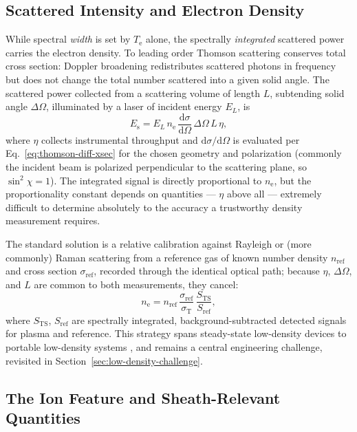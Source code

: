 \subsection{Scattered Intensity and Electron Density}

While spectral \emph{width} is set by $T_{\mathrm{e}}$ alone, the spectrally \emph{integrated} scattered power carries the electron density. To leading order Thomson scattering conserves total cross section: Doppler broadening redistributes scattered photons in frequency but does not change the total number scattered into a given solid angle. The scattered power collected from a scattering volume of length $L$, subtending solid angle $\Delta\Omega$, illuminated by a laser of incident energy $E_{L}$, is
\begin{equation}
E_{\mathrm{s}} = E_{L}\, n_{\mathrm{e}}\, \frac{\mathrm{d}\sigma}{\mathrm{d}\Omega}\,\Delta\Omega\, L\, \eta ,
\label{eq:scattered-energy}
\end{equation}
where $\eta$ collects instrumental throughput and $\mathrm{d}\sigma/\mathrm{d}\Omega$ is evaluated per Eq.~\eqref{eq:thomson-diff-xsec} for the chosen geometry and polarization (commonly the incident beam is polarized perpendicular to the scattering plane, so $\sin^{2}\chi = 1$). The integrated signal is directly proportional to $n_{\mathrm{e}}$, but the proportionality constant depends on quantities — $\eta$ above all — extremely difficult to determine absolutely to the accuracy a trustworthy density measurement requires.

The standard solution is a relative calibration against Rayleigh or (more commonly) Raman scattering from a reference gas of known number density $n_{\mathrm{ref}}$ and cross section $\sigma_{\mathrm{ref}}$, recorded through the identical optical path; because $\eta$, $\Delta\Omega$, and $L$ are common to both measurements, they cancel:
\begin{equation}
n_{\mathrm{e}} = n_{\mathrm{ref}}\,\frac{\sigma_{\mathrm{ref}}}{\sigma_{\mathrm{T}}}\,\frac{S_{\mathrm{TS}}}{S_{\mathrm{ref}}},
\label{eq:ne-calibration}
\end{equation}
where $S_{\mathrm{TS}}$, $S_{\mathrm{ref}}$ are spectrally integrated, background-subtracted detected signals for plasma and reference. This strategy spans steady-state low-density devices \cite{ref0383} to portable low-density systems \cite{ref0357}, and remains a central engineering challenge, revisited in Section~\ref{sec:low-density-challenge}.

\subsection{The Ion Feature and Sheath-Relevant Quantities}

